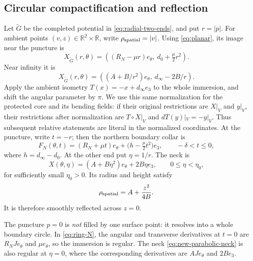 \documentclass[11pt]{amsart}
\theoremstyle{definition}
\theoremstyle{remark}
\newcommand{\R}{\mathbb R}\newcommand{\Sph}{\mathbb S}
\numberwithin{equation}{section}
\begin{document}
\subsection{Circular compactification and reflection}
Let $\widetilde G$ be the completed potential in
\eqref{eq:radial-two-ends}, and put $r=|p|$. For ambient points
$(v,z)\in\R^2\times\R$, write $\rho_{\rm spatial}=|v|$.
Using \eqref{eq:planar}, its image near the puncture is
\begin{equation}\label{eq:new-polar-immersion}
 X_{\widetilde G}(r,\theta)=
 ((R_N-\mu r)e_\theta,\ d_0+\tfrac\mu2r^2).
\end{equation}
Near infinity it is
\begin{equation}\label{eq:new-neck-immersion}
 X_{\widetilde G}(r,\theta)=
 ((A+B/r^2)e_\theta,\ d_\infty-2B/r).
\end{equation}
Apply the ambient isometry $T(x)=-x+d_\infty e_3$ to the whole
immersion, and shift the angular parameter by $\pi$. We use this same
normalization for the protected core and its bending fields: if their
original restrictions are $X|_V$ and $y|_V$, their restrictions after
normalization are $T\circ X|_V$ and $dT(y)|_V=-y|_V$. Thus subsequent
relative statements are literal in the normalized coordinates. At the
puncture, write $t=-r$;
then the northern boundary collar is
\begin{equation}\label{eq:ring-N}
 F_N(\theta,t)=(R_N+\mu t)e_\theta
       +\bigl(h-\tfrac\mu2t^2\bigr)e_3,
 \qquad -\delta<t\le0,
\end{equation}
where $h=d_\infty-d_0$. At the other end put $\eta=1/r$.
The neck is
\begin{equation}\label{eq:new-parabolic-neck}
 X(\theta,\eta)=(A+B\eta^2)e_\theta+2B\eta e_3,
 \qquad 0\le\eta<\eta_0,
\end{equation}
for sufficiently small $\eta_0>0$. Its radius and height satisfy
\begin{equation}\label{eq:parabolic-profile}
 \rho_{\rm spatial}=A+\frac{z^2}{4B}.
\end{equation}
It is therefore smoothly reflected across $z=0$.

The puncture $p=0$ is \emph{not} filled by one surface point: it
resolves into a whole boundary circle. In \eqref{eq:ring-N}, the
angular and transverse derivatives at $t=0$ are
$R_NJe_\theta$ and $\mu e_\theta$, so the immersion is regular.
The neck \eqref{eq:new-parabolic-neck} is also regular at $\eta=0$,
where the corresponding derivatives are $AJe_\theta$ and $2Be_3$.
\end{document}
